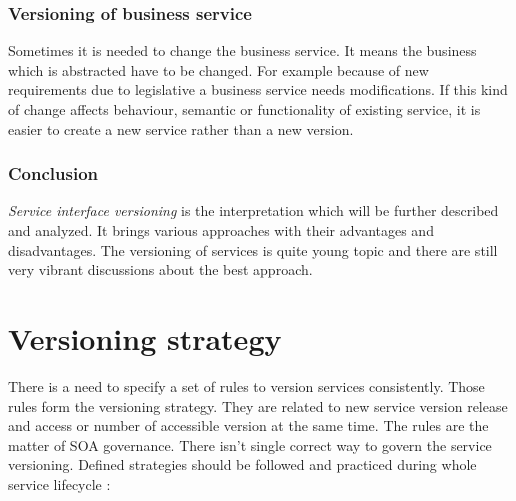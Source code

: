 \subsubsection{Versioning of business service}
Sometimes it is needed to change the business service. It means the business which is abstracted have to be changed. For example because of new requirements due to legislative a business service needs modifications. If this kind of change affects behaviour, semantic or functionality of existing service, it is easier to create a new service rather than a new version. 


\subsubsection{Conclusion}
\emph{Service interface versioning} is the interpretation which will be further described and analyzed. It brings various approaches with their advantages and disadvantages. The versioning of services is quite young topic and there are still very vibrant discussions about the best approach.

\section{Versioning strategy}
\label{sec:version-strategy}
There is a need to specify a set of rules to version services consistently. Those rules form the versioning strategy. They are related to new service version release and access or number of accessible version at the same time. The rules are the matter of SOA governance. There isn't single correct way to govern the service versioning. Defined strategies should be followed and practiced during whole service lifecycle \cite{soa-governance}:

